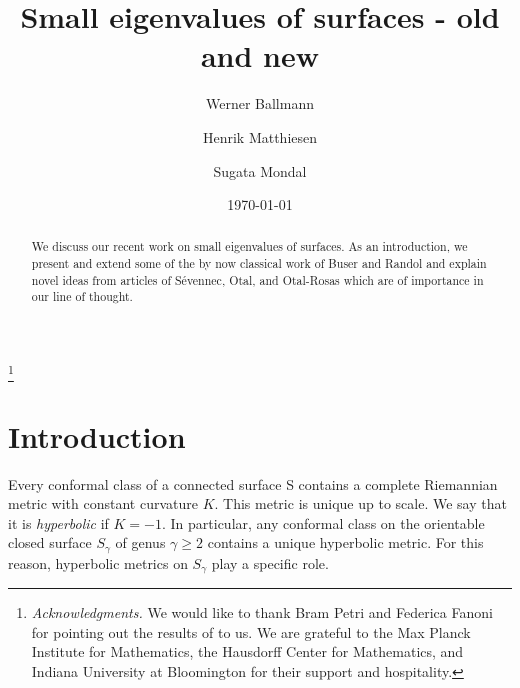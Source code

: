 \documentclass[a4paper,11pt]{amsart}
\numberwithin{equation}{section}
\theoremstyle{definition}
\begin{document}

\title{Small eigenvalues of surfaces - old and new}
\author{Werner Ballmann}
\address
{WB: Max Planck Institute for Mathematics,
Vivatsgasse 7, 53111 Bonn
and Hausdorff Center for Mathematics,
Endenicher Allee 60, 53115 Bonn}
\author{Henrik Matthiesen}
\address
{HM: Max Planck Institute for Mathematics,
Vivatsgasse 7, 53111 Bonn,
and Hausdorff Center for Mathematics,
Endenicher Allee 60, 53115 Bonn}
\author{Sugata Mondal}
\address
{SM: Indiana University,
Rawles Hall, 831 E 3rd Street,
Bloomington, Indiana}

\thanks{\emph{Acknowledgments.}
We would like to thank Bram Petri and Federica Fanoni for pointing out the results of \cite{Pa} to us.
We are grateful to the Max Planck Institute for Mathematics, the Hausdorff Center for Mathematics, and Indiana University at Bloomington for their support and hospitality.}

\date{\today}


\begin{abstract}
We discuss our recent work on small eigenvalues of surfaces.
As an introduction, we present and extend some of the by now classical work of Buser and Randol
and explain novel ideas from articles of S\'evennec, Otal, and Otal-Rosas which are of importance in our line of thought.
\end{abstract}

\maketitle

\tableofcontents

\section{Introduction}
\label{intro}
Every conformal class of a connected surface
S contains a complete Riemannian metric with constant curvature $K$.
This metric is unique up to scale.
We say that it is \emph{hyperbolic} if $K=-1$. 
In particular, any conformal class on the orientable closed surface $S_\gamma$ of genus $\gamma\ge2$ contains a unique hyperbolic metric.
For this reason, hyperbolic metrics on $S_\gamma$ play a specific role.
\end{document}
